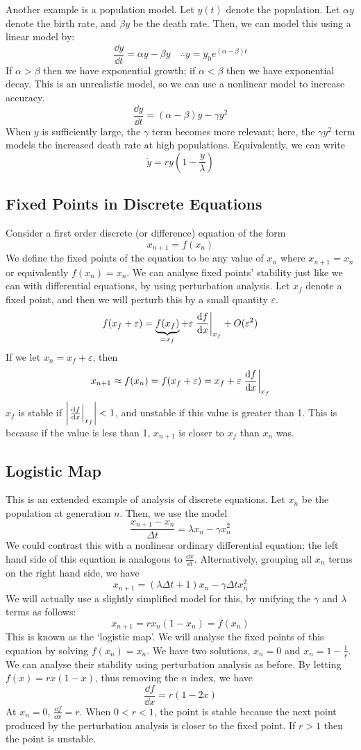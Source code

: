 \documentclass{article}
\begin{document}
Another example is a population model. Let $y(t)$ denote the population. Let $\alpha y$ denote the birth rate, and $\beta y$ be the death rate. Then, we can model this using a linear model by:
\[ \frac{\dd y}{\dd t} = \alpha y - \beta y \quad \therefore y = y_0 e^{(\alpha - \beta) t} \]
If $\alpha > \beta$ then we have exponential growth; if $\alpha < \beta$ then we have exponential decay. This is an unrealistic model, so we can use a nonlinear model to increase accuracy.
\[ \frac{\dd y}{\dd t} = (\alpha - \beta)y - \gamma y^2 \]
When $y$ is sufficiently large, the $\gamma$ term becomes more relevant; here, the $\gamma y^2$ term models the increased death rate at high populations. Equivalently, we can write
\[ \dot y = ry\left(1 - \frac{y}{\lambda}\right) \]

\subsection{Fixed Points in Discrete Equations}
Consider a first order discrete (or difference) equation of the form
\[ x_{n+1} = f(x_n) \]
We define the fixed points of the equation to be any value of $x_n$ where $x_{n+1} = x_n$ or equivalently $f(x_n) = x_n$. We can analyse fixed points' stability just like we can with differential equations, by using perturbation analysis. Let $x_f$ denote a fixed point, and then we will perturb this by a small quantity $\varepsilon$.
\[ f(x_f + \varepsilon) = \underbrace{f(x_f)}_{\mathclap{=x_f}} + \varepsilon \eval{\frac{\dd f}{\dd x}}_{x_f} + O(\varepsilon^2) \]
If we let $x_n = x_f + \varepsilon$, then
\[ x_{n+1} \approx f(x_n) = f(x_f + \varepsilon) = x_f + \varepsilon \eval{\frac{\dd f}{\dd x}}_{x_f} \]
$x_f$ is stable if $\abs{\eval{\frac{\dd f}{\dd x}}_{x_f}} < 1$, and unstable if this value is greater than 1. This is because if the value is less than 1, $x_{n+1}$ is closer to $x_f$ than $x_n$ was.

\subsection{Logistic Map}
This is an extended example of analysis of discrete equations. Let $x_n$ be the population at generation $n$. Then, we use the model
\[ \frac{x_{n+1} - x_n}{\Delta t} = \lambda x_n - \gamma x_n^2 \]
We could contrast this with a nonlinear ordinary differential equation; the left hand side of this equation is analogous to $\frac{\dd x}{\dd t}$. Alternatively, grouping all $x_n$ terms on the right hand side, we have
\[ x_{n+1} = (\lambda \Delta t + 1)x_n - \gamma \Delta t x_n^2 \]
We will actually use a slightly simplified model for this, by unifying the $\gamma$ and $\lambda$ terms as follows:
\[ x_{n+1} = r x_n (1 - x_n) = f(x_n) \]
This is known as the `logistic map'. We will analyse the fixed points of this equation by solving $f(x_n) = x_n$. We have two solutions, $x_n = 0$ and $x_n = 1 - \frac{1}{r}$. We can analyse their stability using perturbation analysis as before. By letting $f(x) = rx(1-x)$, thus removing the $n$ index, we have
\[ \frac{\dd f}{\dd x} = r(1-2x) \]
At $x_n = 0$, $\frac{\dd f}{\dd x} = r$. When $0 < r < 1$, the point is stable because the next point produced by the perturbation analysis is closer to the fixed point. If $r > 1$ then the point is unstable.
\end{document}
